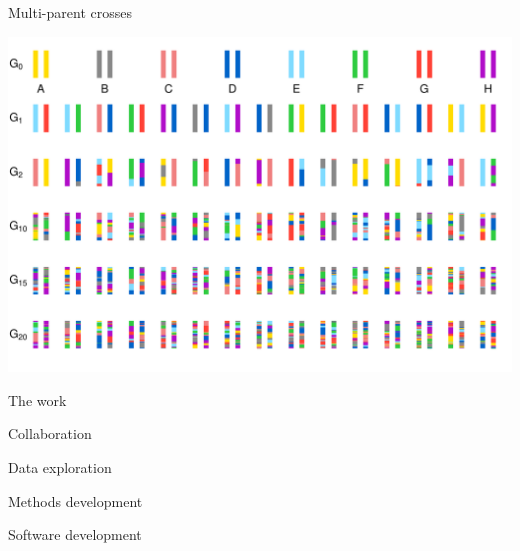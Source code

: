 \documentclass[12pt,t,aspectratio=169]{beamer}
\begin{document}
\begin{frame}{Multi-parent crosses}

\centerline{
  \includegraphics[height=0.95\textheight]{Figs/hs_light.pdf}
}


\end{frame}



\begin{frame}{The work}

    \bbi
  \item Collaboration
  \item Data exploration
  \item Methods development
  \item Software development
    \ei

\end{frame}
\end{document}
